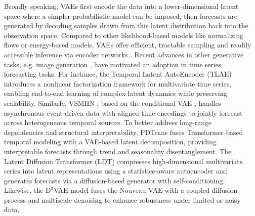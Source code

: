 \documentclass[a4paper,oneside,bibliography=totoc]{scrbook}
\begin{document}
Broadly speaking, VAEs first encode the data into a lower-dimensional latent space where a simpler probabilistic model can be imposed, then forecasts are generated by decoding samples drawn from this latent distribution back into the observation space.
Compared to other likelihood-based models like normalizing flows or energy-based models, VAEs offer efficient, tractable sampling and readily accessible inference via encoder networks \cite{vahdat_nvae_2020}.
Recent advances in other generative tasks, e.g. image generation \cite{vahdat_nvae_2020, luo_energy-calibrated_2025}, have motivated an adoption in time series forecasting tasks. 
For instance, the Temporal Latent AutoEncoder (TLAE) \cite{nguyen_temporal_2021} introduces a nonlinear factorization framework for multivariate time series, enabling end-to-end learning of complex latent dynamics while preserving scalability. 
Similarly, VSMHN \cite{li_synergetic_2021}, based on the conditional VAE \cite{sohn_learning_2015},  handles asynchronous event-driven data with aligned time encodings to jointly forecast across heterogeneous temporal sources.
To better address long-range dependencies and structural interpretability, PDTrans \cite{tong_probabilistic_2022} fuses Transformer-based temporal modeling with a VAE-based latent decomposition, providing interpretable forecasts through trend and seasonality disentanglement.
The Latent Diffusion Transformer (LDT) \cite{feng_latent_2024} compresses high-dimensional multivariate series into latent representations using a statistics-aware autoencoder and generates forecasts via a diffusion-based generator with self-conditioning.
Likewise, the D$^3$VAE \cite{li_generative_2022} model fuses the Nouveau VAE \cite{vahdat_nvae_2020} with a coupled diffusion process and multiscale denoising to enhance robustness under limited or noisy data. \\
\end{document}
